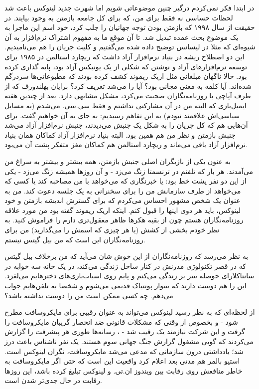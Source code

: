 در ابتدا فکر نمی‌کردم درگیر چنین موضوعاتی شویم اما شهرت جدید لینوکس
باعث شد لحظات حساسی نه فقط برای من، که برای کل جامعه بازمتن به وجود
بیایند. در حقیقت از سال ۱۹۹۸ که بازمتن بودن توجه جهانیان را جلب کرد،‌
خود اسم این ماجرا به یک موضوع بحث عمده تبدیل شد. تا آن موقع ما به
مفهوم اشتراک نرم‌افزار به آن شیوه‌ای که مثلا در لیسانس  توضیح
داده شده  می‌گفتیم و کلیت جریان را هم
 می‌نامیدیم. این دو اصطلاح ریشه در بنیاد
نرم‌افزار آزاد داشت که ریچارد استالمن در ۱۹۸۵ برای توسعه نرم‌افزارهای
آزاد و نوشتن  که شکلی از یک یونیکس آزاد بود، پایه گذاری کرده
بود. حالا ناگهان مبلغانی مثل اریک ریموند کشف کرده بودند که مطبوعاتی‌ها
سردرگم شده‌اند. آیا کلمه  به معنی مجانی بود؟ آیا
 را می‌شد  تعریف کرد؟ برایان
بهلندورف که از طرف آپاچی با روزنامه‌نگاران
صحبت می‌کرد،‌ مشکل مشابهی دارد. بعد از چندین هفته ایمیل‌بازی که البته من
در آن مشارکتی نداشتم و فقط سی.سی. می‌شدم (به مسایل سیاسی‌اش علاقمند
نبودم) به این تفاهم رسیدیم: به جای  به آن 
خواهیم گفت. برای آن‌هایی هم که کل جریان را به شکل یک جنبش می‌دیدند، جنبش
نرم‌افزار آزاد می‌شد جنبش بازمتن و نظر من هم همین بود. البته بنیاد
نرم‌افزار آزاد کماکان همان بنیاد نرم‌افزار آزاد باقی می‌ماند و ریچارد
استالمن هم کماکان مغز متفکر پشت آن می‌بود.

به عنون یکی از بازیگران اصلی جنبش بازمتن، همه بیشتر و بیشتر به سراغ من
می‌آمدند. هر بار که تلفنم در ترنسمتا زنگ می‌زد - و آن روزها همیشه زنگ
می‌زد - یکی از این دو نفر پشت خط بود: یا خبرنگاری که می‌خواهد با من
مصاحبه کند یا کسی که می‌خواهد از طرف سازمانش من را برای سخنرانی به یک
جلسه دعوت کند. من به عنوان یک شخص مشهور احساس می‌کردم که برای گسترش
اندیشه بازمتن و خود لینوکس، باید هر دوی اینها را قبول کنم. اینکه اریک
ریموند گفته بود من مورد علاقه روزنامه‌نگاران هستم چون از بقیه هکرها
ظاهر معقول‌تری دارم را فراموش کنید. به نظر خودم بخشی از کشش (یا هر چیزی
که اسمش را می‌گذارید) من برای روزنامه‌نگاران این است که من بیل گیتس
نیستم.

به نظر می‌رسد که روزنامه‌نگاران از این خوش شان می‌آید که من برخلاف بیل
گیتس که در قصر تکنولوژی مدرنش در کنار ساحل زندگی می‌کند، در یک خانه سه
خوابه در سانتاکلارای حوصله سر بر زندگی می‌کنم و پایم روی اسباب‌بازی‌های
دخترهایم می‌لغزد. این را هم دوست دارند که سوار پونتیاک قدیمی می‌شوم و
شخصا به تلفن‌هایم جواب می‌دهم. چه کسی ممکن است من را دوست نداشته باشد؟

از لحظه‌ای که به نظر رسید لینوکس می‌تواند به عنوان رقیبی برای مایکروسافت
مطرح شود - و بخصوص از وقتی که مشکلات قانونی ضد انحصار گریبان
مایکروسافت را گرفت و این شرکت نیازمند یک رقیب شد - ، رسانه‌ها طوری هر
پیشرفت را گزارش می‌کردند که گویی مشغول گزارش جنگ جهانی سوم هستند. یک
نفر ناشناس باعث درز  شد؛ یادداشتی درون سازمانی که
مدعی می‌شد مایکروسافت، نگران لینوکس است. استیو بالمر هم مدتی بعد اعلام
کرد  واقعیت این است که حتی اگر مایکروسافت
به خاطر منافعش روی رقابت بین ویندوز ان.تی. و لینوکس تبلیغ کرده باشد،
این روزها رقابت در حال جدی‌تر شدن است.

